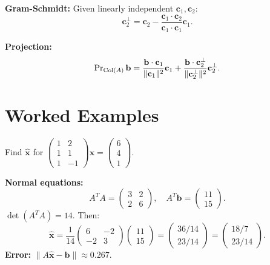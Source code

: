 \textbf{Gram-Schmidt:} Given linearly independent $\mathbf{c}_1, \mathbf{c}_2$:
\[
  \mathbf{c}_2^\perp = \mathbf{c}_2 - \frac{\mathbf{c}_1\cdot\mathbf{c}_2}{\mathbf{c}_1\cdot\mathbf{c}_1}\mathbf{c}_1.
\]

\textbf{Projection:}
\[
  \operatorname{Pr}_{\operatorname{Col}(A)}\mathbf{b} = \frac{\mathbf{b}\cdot\mathbf{c}_1}{\|\mathbf{c}_1\|^2}\mathbf{c}_1 + \frac{\mathbf{b}\cdot\mathbf{c}_2^\perp}{\|\mathbf{c}_2^\perp\|^2}\mathbf{c}_2^\perp.
\]

\section{Worked Examples}

\begin{example}
Find $\hat{\mathbf{x}}$ for $\begin{pmatrix}1&2\\1&1\\1&-1\end{pmatrix}\mathbf{x}=\begin{pmatrix}6\\4\\1\end{pmatrix}$.

\textbf{Normal equations:}
\[
A^TA=\begin{pmatrix}3&2\\2&6\end{pmatrix}, \quad A^T\mathbf{b}=\begin{pmatrix}11\\15\end{pmatrix}.
\]
$\det(A^TA)=14$. Then:
\[
\hat{\mathbf{x}}=\frac{1}{14}\begin{pmatrix}6&-2\\-2&3\end{pmatrix}\begin{pmatrix}11\\15\end{pmatrix} = \begin{pmatrix}36/14\\23/14\end{pmatrix} = \begin{pmatrix}18/7\\23/14\end{pmatrix}.
\]
\textbf{Error:} $\|A\hat{\mathbf{x}}-\mathbf{b}\|\approx 0.267$.
\end{example}

